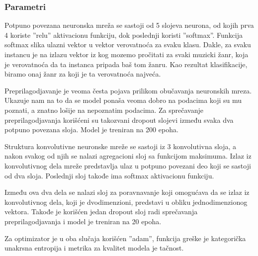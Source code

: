 \documentclass{article}
\begin{document}
\subsubsection{Parametri}

Potpuno povezana neuronska mreža se sastoji od 5 slojeva neurona, od kojih prva 4 koriste ''relu'' aktivacionu funkciju, dok poslednji koristi ''softmax''. Funkcija softmax slika ulazni vektor u vektor verovatnoća za svaku klasu. Dakle, za svaku instancu je na izlazu vektor iz kog mozemo pročitati za svaki muzicki žanr, koja je verovatnoća da ta instanca pripada baš tom žanru. Kao rezultat klasifikacije, biramo onaj žanr za koji je ta verovatnoća najveća.

Preprilagodjavanje je veoma česta pojava prilikom obučavanja neuronskih mreza. Ukazuje nam na to da se model ponaša veoma dobro na podacima koji su mu poznati, a znatno lošije na nepoznatim podacima. Za sprečavanje preprilagodjavanja korišćeni su takozvani dropout slojevi između svaka dva potpuno povezana sloja. Model je treniran na 200 epoha.

Struktura konvolutivne neuronske mreže se sastoji iz 3 konvolutivna sloja, a nakon svakog od njih se nalazi agregacioni sloj sa funkcijom maksimuma. Izlaz iz konvolutivnog dela mreže predstavlja ulaz u potpuno povezani deo koji se sastoji od dva sloja. Poslednji sloj takođe ima softmax aktivacionu funkciju.

Između ova dva dela se nalazi sloj za poravnavanje koji omogućava da se izlaz iz konvolutivnog dela, koji je dvodimenzioni, predstavi u obliku jednodimenzionog vektora. Takođe je korišćen jedan dropout sloj radi sprečavanja preprilagodjavanja i model je treniran na 20 epoha.

Za optimizator je u oba slučaja korišćen ''adam'', funkcija greške je kategorička unakrsna entropija i metrika za kvalitet modela je tačnost. 
\end{document}
